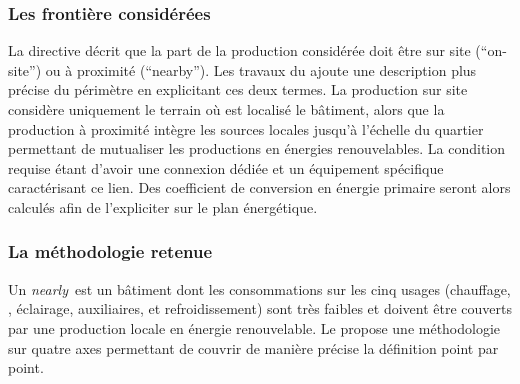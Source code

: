 \subsubsection{Les frontière considérées} %
\label{ssub:les_frontière_considérées}
La directive décrit que la part de la production considérée doit être sur site (\enquote{on-site})
ou à proximité (\enquote{nearby}). Les travaux du  ajoute une description plus précise
du périmètre en explicitant ces deux termes. La production sur site considère uniquement
le terrain où est localisé le bâtiment, alors que la production à proximité intègre
les sources locales jusqu’à l’échelle du quartier permettant de mutualiser les productions
en énergies renouvelables.
La condition requise étant d’avoir une connexion dédiée et un équipement spécifique
caractérisant ce lien. Des coefficient de conversion en énergie primaire seront
alors calculés afin de l’expliciter sur le plan énergétique.​



\subsubsection{La méthodologie retenue} %
\label{ssub:la_methodologie_retenue}
Un \textit{nearly}\, est un bâtiment dont les consommations sur les cinq usages
(chauffage, , éclairage, auxiliaires, et refroidissement)
sont très faibles et doivent être couverts par une production locale en énergie renouvelable.
Le  propose une méthodologie sur quatre axes permettant de couvrir de manière
précise la définition point par point.

